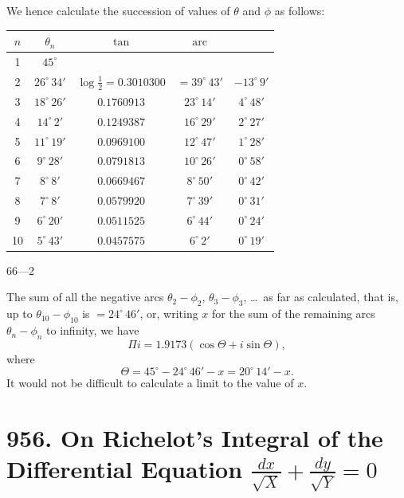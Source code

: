 \documentclass[11pt,a4paper]{book}
\begin{document}
{{{We hence calculate the succession of values of $\theta$ and $\phi$ as follows:

\begin{center}
\begin{tabular}{c|c|c|c|c}
\toprule
$n$ & $\theta_n$ & $\tan$ & $\operatorname{arc}$ & \\
\midrule
1 & $45^{\circ}$ & & & \\
2 & $26^{\circ}\,34'$ & $\log \tfrac{1}{2} = 0.3010300$ & $= 39^{\circ}\,43'$ & $-13^{\circ}\,9'$ \\
3 & $18^{\circ}\,26'$ & $0.1760913$ & $23^{\circ}\,14'$ & $4^{\circ}\,48'$ \\
4 & $14^{\circ}\,2'$ & $0.1249387$ & $16^{\circ}\,29'$ & $2^{\circ}\,27'$ \\
5 & $11^{\circ}\,19'$ & $0.0969100$ & $12^{\circ}\,47'$ & $1^{\circ}\,28'$ \\
6 & $9^{\circ}\,28'$ & $0.0791813$ & $10^{\circ}\,26'$ & $0^{\circ}\,58'$ \\
7 & $8^{\circ}\,8'$ & $0.0669467$ & $8^{\circ}\,50'$ & $0^{\circ}\,42'$ \\
8 & $7^{\circ}\,8'$ & $0.0579920$ & $7^{\circ}\,39'$ & $0^{\circ}\,31'$ \\
9 & $6^{\circ}\,20'$ & $0.0511525$ & $6^{\circ}\,44'$ & $0^{\circ}\,24'$ \\
10 & $5^{\circ}\,43'$ & $0.0457575$ & $6^{\circ}\,2'$ & $0^{\circ}\,19'$ \\
\bottomrule
\end{tabular}
\end{center}

\hfill 66---2

\newpage

The sum of all the negative arcs $\theta_2-\phi_2$, $\theta_3-\phi_3$, \dots\ as far as calculated, that is, up to $\theta_{10}-\phi_{10}$ is $= 24^{\circ}\,46'$, or, writing $x$ for the sum of the remaining arcs $\theta_n-\phi_n$ to infinity, we have
\[
\Pi i = 1.9173(\cos\Theta + i\sin\Theta),
\]
where
\[
\Theta = 45^{\circ} - 24^{\circ}\,46' - x = 20^{\circ}\,14' - x.
\]
It would not be difficult to calculate a limit to the value of $x$.

\newpage
\section{956. On Richelot's Integral of the Differential Equation $\frac{dx}{\sqrt{X}} + \frac{dy}{\sqrt{Y}} = 0$}
\label{sec:956}

}}}
\end{document}
